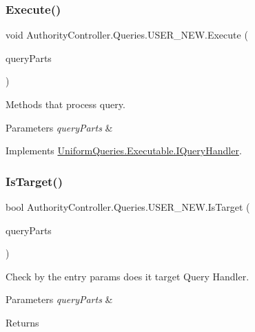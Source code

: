 \subsubsection{\texorpdfstring{Execute()}{Execute()}}
{\footnotesize\ttfamily void Authority\+Controller.\+Queries.\+U\+S\+E\+R\+\_\+\+N\+E\+W.\+Execute (\begin{DoxyParamCaption}\item[{\mbox{\hyperlink{struct_uniform_queries_1_1_query_part}{Query\+Part}} \mbox{[}$\,$\mbox{]}}]{query\+Parts }\end{DoxyParamCaption})}



Methods that process query. 


\begin{DoxyParams}{Parameters}
{\em query\+Parts} & \\
\hline
\end{DoxyParams}


Implements \mbox{\hyperlink{interface_uniform_queries_1_1_executable_1_1_i_query_handler_a3268d72c0388f5e3debba4d73bdfe523}{Uniform\+Queries.\+Executable.\+I\+Query\+Handler}}.

\mbox{\label{class_authority_controller_1_1_queries_1_1_u_s_e_r___n_e_w_a6e26596b5a5ecc3d07591766b5d325ec}} 
\subsubsection{\texorpdfstring{Is\+Target()}{IsTarget()}}
{\footnotesize\ttfamily bool Authority\+Controller.\+Queries.\+U\+S\+E\+R\+\_\+\+N\+E\+W.\+Is\+Target (\begin{DoxyParamCaption}\item[{\mbox{\hyperlink{struct_uniform_queries_1_1_query_part}{Query\+Part}} \mbox{[}$\,$\mbox{]}}]{query\+Parts }\end{DoxyParamCaption})}



Check by the entry params does it target Query Handler. 


\begin{DoxyParams}{Parameters}
{\em query\+Parts} & \\
\hline
\end{DoxyParams}
\begin{DoxyReturn}{Returns}

\end{DoxyReturn}


